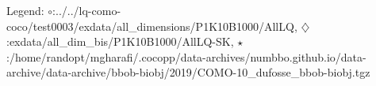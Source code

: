 Legend: {\color{NavyBlue}$\circ$}:../../lq-como-coco/test0003/exdata/all\_dimensions/P1K10B1000/AllLQ, {\color{Magenta}$\diamondsuit$}:exdata/all\_dim\_bis/P1K10B1000/AllLQ-SK, {\color{Orange}$\star$}:/home/randopt/mgharafi/.cocopp/data-archives/numbbo.github.io/data-archive/data-archive/bbob-biobj/2019/COMO-10\_dufosse\_bbob-biobj.tgz